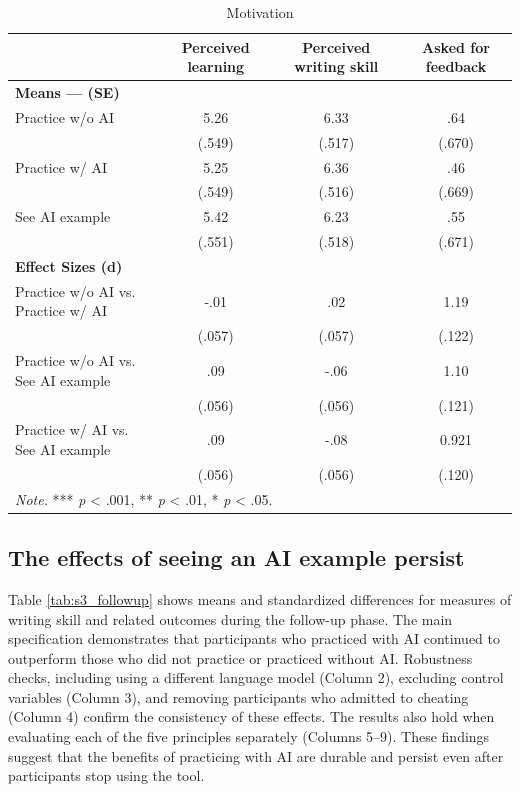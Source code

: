 \documentclass[11pt]{report}
\begin{document}
\begin{append}
\begin{table}[h]
    \centering
    \caption{Motivation}

\begin{tabular}{lccc}
\toprule
  & Perceived learning & Perceived writing skill & Asked for feedback \\ 
\midrule
\multicolumn{4}{l}{\textbf{Means --- (SE)}} \\ 
\midrule
Practice w/o AI & 5.26 & 6.33 & .64 \\ 
 & (.549) & (.517) & (.670) \\ 
Practice w/ AI & 5.25 & 6.36 & .46 \\ 
 & (.549) & (.516) & (.669) \\ 
See AI example & 5.42 & 6.23 & .55 \\ 
 & (.551) & (.518) & (.671) \\ 
\midrule
\multicolumn{4}{l}{ \textbf{Effect Sizes (d)}} \\ 
\midrule
Practice w/o AI vs. Practice w/ AI & -.01 & .02 & 1.19 \\ 
 & (.057) & (.057) & (.122) \\ 
Practice w/o AI vs. See AI example & .09 & -.06 & 1.10 \\ 
 & (.056) & (.056) & (.121) \\ 
Practice w/ AI vs. See AI example & .09 & -.08 & 0.921 \\ 
 & (.056) & (.056) & (.120) \\ 
\midrule
\multicolumn{4}{l}{\textit{Note.} *** \textit{p} < .001, ** \textit{p} < .01, * \textit{p} < .05.}
\vspace{5pt}
\end{tabular}
    \label{tab:motivation3}
\end{table}

\FloatBarrier
\subsection{The effects of seeing an AI example persist}\label{sec:persist3}

Table \ref{tab:s3_followup} shows means and standardized differences for measures of writing skill and related outcomes during the follow-up phase. The main specification demonstrates that participants who practiced with AI continued to outperform those who did not practice or practiced without AI. Robustness checks, including using a different language model (Column 2), excluding control variables (Column 3), and removing participants who admitted to cheating (Column 4) confirm the consistency of these effects. The results also hold when evaluating each of the five principles separately (Columns 5–9). These findings suggest that the benefits of practicing with AI are durable and persist even after participants stop using the tool.


\end{append}
\end{document}
